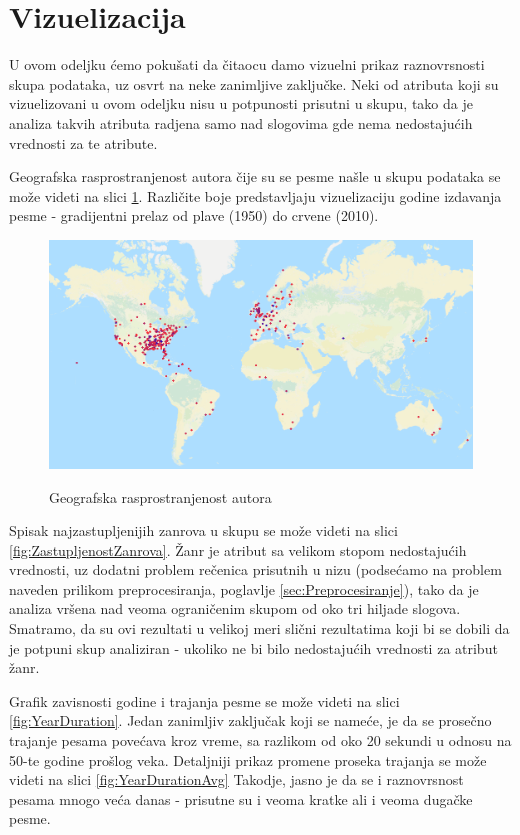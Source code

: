 \section{Vizuelizacija}
\label{sec:Vizuelizacija}

U ovom odeljku \'c{}emo poku\v{s}ati da \v{c}itaocu damo vizuelni prikaz raznovrsnosti skupa podataka, uz osvrt na neke zanimljive zaklju\v{c}ke. Neki od atributa koji su vizuelizovani u ovom odeljku nisu u potpunosti prisutni u skupu, tako da je analiza takvih atributa radjena samo nad slogovima gde nema nedostaju\'c{}ih vrednosti za te atribute.

Geografska rasprostranjenost autora \v{c}ije su se pesme na\v{s}le u skupu podataka se mo\v{z}e videti na slici \ref{fig:Geolokacija}. Razli\v{c}ite boje predstavljaju vizuelizaciju godine izdavanja pesme - gradijentni prelaz od plave (1950) do crvene (2010).

\begin{figure}[H]
    \centering
    \includegraphics[scale=0.45]{resources/Geolokacija.png}
    \label{fig:Geolokacija}
    \caption{Geografska rasprostranjenost autora}
\end{figure}

Spisak najzastupljenijih zanrova u skupu se mo\v{z}e videti na slici \ref{fig:ZastupljenostZanrova}. \v{Z}anr je atribut sa velikom stopom nedostaju\'c{}ih vrednosti, uz dodatni problem re\v{c}enica prisutnih u nizu (podse\'c{}amo na problem naveden prilikom preprocesiranja, poglavlje \ref{sec:Preprocesiranje}), tako da je analiza vr\v{s}ena nad veoma ograni\v{c}enim skupom od oko tri hiljade slogova. Smatramo, da su ovi rezultati u velikoj meri sli\v{c}ni rezultatima koji bi se dobili da je potpuni skup analiziran - ukoliko ne bi bilo nedostaju\'c{}ih vrednosti za atribut \v{z}anr.

Grafik zavisnosti godine i trajanja pesme se mo\v{z}e videti na slici \ref{fig:YearDuration}. Jedan zanimljiv zaklju\v{c}ak koji se name\'c{}e, je da se prose\v{c}no trajanje pesama pove\'c{}ava kroz vreme, sa razlikom od oko 20 sekundi u odnosu na 50-te godine pro\v{s}log veka. Detaljniji prikaz promene proseka trajanja se mo\v{z}e videti na slici \ref{fig:YearDurationAvg} Takodje, jasno je da se i raznovrsnost pesama mnogo ve\'c{}a danas - prisutne su i veoma kratke ali i veoma duga\v{c}ke pesme.

